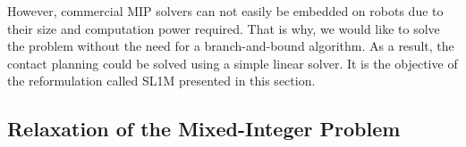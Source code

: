 However, commercial MIP solvers can not easily be embedded on robots due to their size and computation power required.
That is why, we would like to solve the problem without the need for a branch-and-bound algorithm.
As a result, the contact planning could be solved using a simple linear solver.
It is the objective of the reformulation called SL1M \cite{sl1m_v1} presented in this section.

\subsection{Relaxation of the Mixed-Integer Problem}

